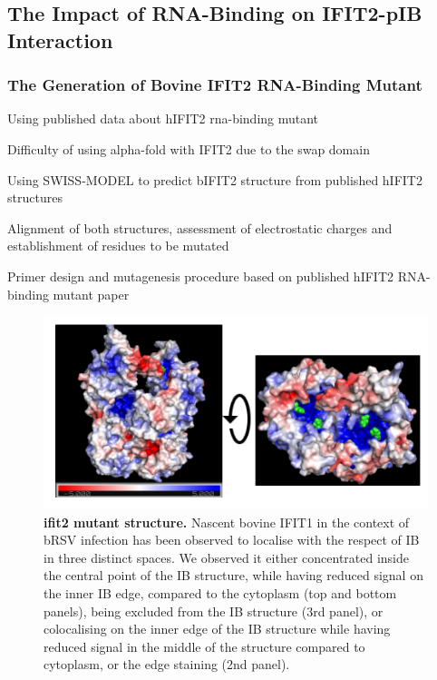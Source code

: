 \subsection{The Impact of RNA-Binding on IFIT2-pIB Interaction} \label{subsec:The Impact of RNA-Binding on IFIT2-pIB Interaction}
\subsubsection{The Generation of Bovine IFIT2 RNA-Binding Mutant} \label{The Generation of Bovine IFIT2 RNA-Binding Mutant}
Using published data about hIFIT2 rna-binding mutant

Difficulty of using alpha-fold with IFIT2 due to the swap domain

Using SWISS-MODEL to predict bIFIT2 structure from published hIFIT2 structures

Alignment of both structures, assessment of electrostatic charges and establishment of residues to be mutated

Primer design and mutagenesis procedure based on published hIFIT2 RNA-binding mutant paper

\begin{figure}
    \centering
    \includegraphics[width=1\linewidth]{10. Chapter 5/Figs/04. IFIT2-RNA binding mutant/01. structure.png}
    \caption[ifit2 mutant structure]{\textbf{ifit2 mutant structure.} Nascent bovine IFIT1 in the context of bRSV infection has been observed to localise with the respect of IB in three distinct spaces. We observed it either concentrated inside the central point of the IB structure, while having reduced signal on the inner IB edge, compared to the cytoplasm (top and bottom panels), being excluded from the IB structure (3rd panel), or colocalising on the inner edge of the IB structure while having reduced signal in the middle of the structure compared to cytoplasm, or the edge staining (2nd panel).}
    \label{fig:ifit2 mutant structure}
\end{figure}

